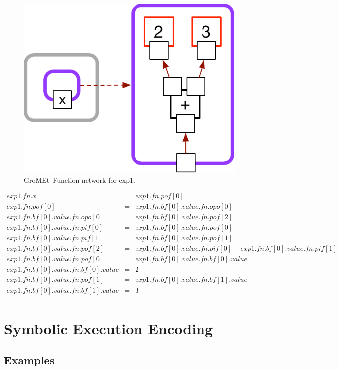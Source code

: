 \documentclass{article}
\newcommand{\gromet}{GroMEt}
\begin{document}
\begin{figure}
\includegraphics[width=0.5\linewidth]{fig/exp1_gromet_FN_manual_diagram.pdf}
\caption{\gromet\ Function network for exp1.}
\end{figure}


    

\begin{eqnarray*}
    exp1.fn.x &=& exp1.fn.pof[0]\\
    exp1.fn.pof[0] &=& exp1.fn.bf[0].value.fn.opo[0]\\
    exp1.fn.bf[0].value.fn.opo[0] &=& exp1.fn.bf[0].value.fn.pof[2]\\
    exp1.fn.bf[0].value.fn.pif[0] &=& exp1.fn.bf[0].value.fn.pof[0]\\
    exp1.fn.bf[0].value.fn.pif[1] &=& exp1.fn.bf[0].value.fn.pof[1]\\
    exp1.fn.bf[0].value.fn.pof[2] &=& exp1.fn.bf[0].value.fn.pif[0] + exp1.fn.bf[0].value.fn.pif[1]\\
    exp1.fn.bf[0].value.fn.pof[0] &=& exp1.fn.bf[0].value.fn.bf[0].value\\
    exp1.fn.bf[0].value.fn.bf[0].value &=& 2\\
    exp1.fn.bf[0].value.fn.pof[1] &=& exp1.fn.bf[0].value.fn.bf[1].value\\
    exp1.fn.bf[0].value.fn.bf[1].value &=& 3\\
\end{eqnarray*}

\section{Symbolic Execution Encoding}

\subsection{Examples}
\end{document}
